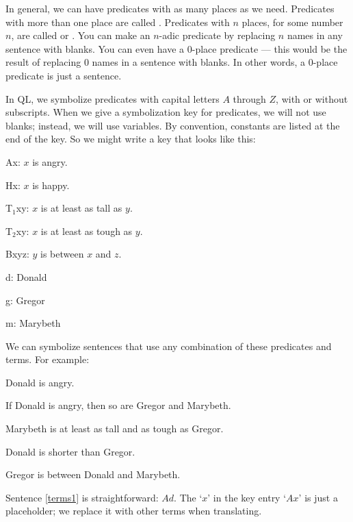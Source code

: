 In general, we can have predicates with as many places as we need. Predicates with more than one place are called . Predicates with $n$ places, for some number $n$, are called  or . You can make an $n$-adic predicate by replacing $n$ names in any sentence with blanks. You can even have a 0-place predicate --- this would be the result of replacing $0$ names in a sentence with blanks. In other words, a 0-place predicate is just a sentence.

In QL, we symbolize predicates with capital letters $A$ through $Z$, with or without subscripts. When we give a symbolization key for predicates, we will not use blanks; instead, we will use variables. By convention, constants are listed at the end of the key. So we might write a key that looks like this:
\begin{groupitems}
\begin{ekey}
\item[Ax:] $x$ is angry.
\item[Hx:] $x$ is happy.
\item[T$_1$xy:] $x$ is at least as tall as $y$.
\item[T$_2$xy:] $x$ is at least as tough as $y$.
\item[Bxyz:] $y$ is between $x$ and $z$.
\item[d:] Donald
\item[g:] Gregor
\item[m:] Marybeth
\end{ekey}
\end{groupitems}

We can symbolize sentences that use any combination of these predicates and terms. For example:
\begin{earg}
\item[\ex{terms1}] Donald is angry.
\item[\ex{terms2}] If Donald is angry, then so are Gregor and Marybeth.
\item[\ex{terms3}] Marybeth is at least as tall and as tough as Gregor.
\item[\ex{terms4}] Donald is shorter than Gregor.
\item[\ex{terms5}] Gregor is between Donald and Marybeth.
\end{earg}

Sentence \ref{terms1} is straightforward: $Ad$. The `$x$' in the key entry `$Ax$' is just a placeholder; we replace it with other terms when translating.

